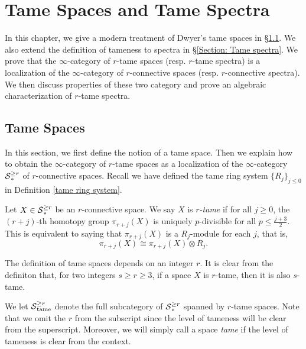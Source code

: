 \chapter{Tame Spaces and Tame Spectra}
In this chapter, we give a modern treatment of Dwyer's tame spaces in \S \ref{Section Tame spaces}. We also extend the definition of tameness to spectra in \S \ref{Section: Tame spectra}.
We prove that the $\infty$-category of $r$-tame spaces (resp. $r$-tame spectra) is a localization of the $\infty$-category of $r$-connective spaces (resp. $r$-connective spectra).
We then discuss properties of these two category and prove an algebraic characterization of $r$-tame spectra.

\section{Tame Spaces}
\label{Section Tame spaces}
In this section, we first define the notion of a tame space.
Then we explain how to obtain the $\infty$-category of $r$-tame spaces as a localization of the $\infty$-category $\operatorname{\mathcal{S}}_{*}^{\geq r}$ of $r$-connective spaces.
Recall we have defined the tame ring system $\{R_{j}\}_{j \leq 0}$ in Definition \ref{tame ring system}.

\begin{definition}
	\label{Tame spaces}
	Let $X\in \operatorname{\mathcal{S}}_{*}^{\geq r}$ be an $r$-connective space.
	We say $X$ is \emph{$r$-tame} if for all $j\geq 0$, the $(r+j)$-th homotopy group $\pi_{r+j}(X)$ is uniquely $p$-divisible for all $p\leq \frac{j+3}{2}$. 
	This is equivalent to saying that $\pi_{r+j}(X)$ is a $R_j$-module for each $j$, that is,
	\[
	\pi_{r+j}(X)\cong \pi_{r+j}(X)\otimes R_{j}.
	\]
\end{definition}

    \begin{remark}
        The definition of tame spaces depends on an integer $r$.
        It is clear from the definiton that,
        for two integers $s\geq r \geq 3$, if a space $X$ is $r$-tame, then it is also $s$-tame. 
    \end{remark}
    
    \begin{notation}
        We let $\operatorname{\mathcal{S}}^{\geq r}_{\operatorname{\operatorname{tame}}}$ denote the full subcategory of $\operatorname{\mathcal{S}}^{\geq r}_{*}$ spanned by $r$-tame spaces.
       Note that we omit the $r$ from the subscript since the level of tameness will be clear from the superscript.
       Moreover, we will simply call a space \emph{tame} if the level of tameness is clear from the context.
    \end{notation}
    

